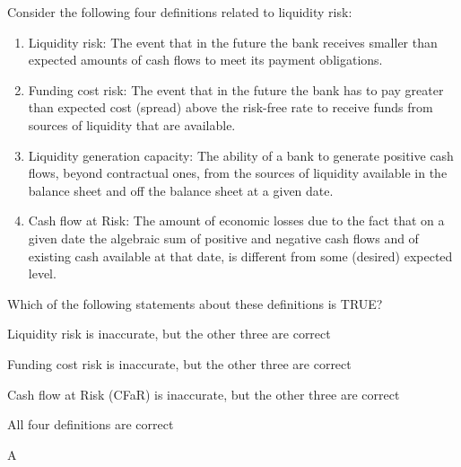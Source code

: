 \documentclass{article}
\newcounter{question} %
\begin{document}
\begin{question}
    Consider the following four definitions related to liquidity risk:
    \begin{enumerate}
        \item Liquidity risk: The event that in the future the bank receives smaller than expected amounts of cash flows to meet its payment obligations.
        \item Funding cost risk: The event that in the future the bank has to pay greater than expected cost (spread) above the risk-free rate to receive funds from sources of liquidity that are available.
        \item Liquidity generation capacity: The ability of a bank to generate positive cash flows, beyond contractual ones, from the sources of liquidity available in the balance sheet and off the balance sheet at a given date.
        \item Cash flow at Risk: The amount of economic losses due to the fact that on a given date the algebraic sum of positive and negative cash flows and of existing cash available at that date, is different from some (desired) expected level.
    \end{enumerate}
    Which of the following statements about these definitions is TRUE?
\end{question}

\begin{choices}
    \item Liquidity risk is inaccurate, but the other three are correct
    \item Funding cost risk is inaccurate, but the other three are correct
    \item Cash flow at Risk (CFaR) is inaccurate, but the other three are correct
    \item All four definitions are correct
\end{choices}

\begin{correctanswer}
    A
\end{correctanswer}
\end{document}

